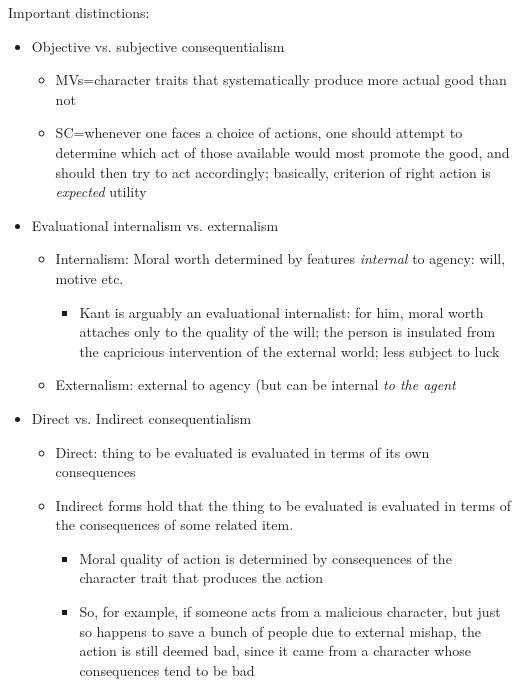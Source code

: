 \documentclass[11pt]{article}
\begin{document}
\noindent Important distinctions:

\begin{itemize}\item{Objective vs. subjective consequentialism}\begin{itemize}\item{MVs=character traits that systematically produce more actual good than not}\item{SC=whenever one faces a choice of actions, one should attempt to determine which act of those available would most promote the good, and should then try to act accordingly; basically, criterion of right action is \emph{expected} utility}\end{itemize}\item{Evaluational internalism vs. externalism}\begin{itemize}\item{Internalism: Moral worth determined by features \emph{internal} to agency: will, motive etc.}\begin{itemize}\item{Kant is arguably an evaluational internalist: for him, moral worth attaches only to the quality of the will; the person is insulated from the capricious intervention of the external world; less subject to luck}\end{itemize}\item{Externalism: external to agency (but can be internal \emph{to the agent}}\end{itemize}\item{Direct vs. Indirect consequentialism}\begin{itemize}\item{Direct: thing to be evaluated is evaluated in terms of its own consequences}\item{Indirect forms hold that the thing to be evaluated is evaluated in terms of the consequences of some related item.}\begin{itemize}\item{Moral quality of action is determined by consequences of the character trait that produces the action}\item{So, for example, if someone acts from a malicious character, but just so happens to save a bunch of people due to external mishap, the action is still deemed bad, since it came from a character whose consequences tend to be bad}\end{itemize}\end{itemize}\end{itemize}
\end{document}

